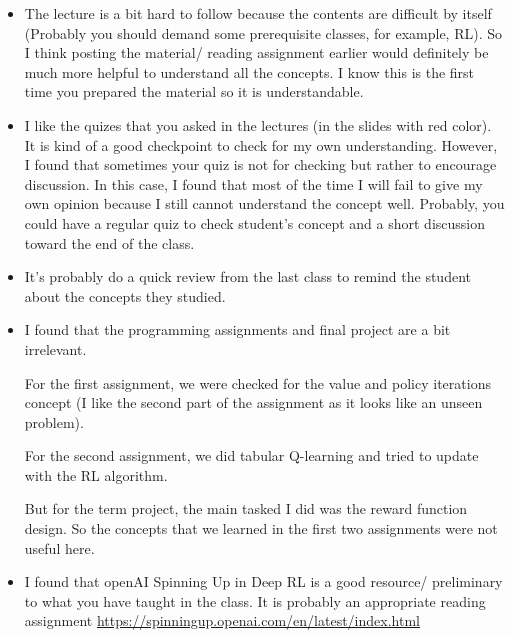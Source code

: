 \documentclass{article}
\begin{document}
    \begin{itemize}
        \item The lecture is a bit hard to follow because the contents are difficult by itself (Probably you should demand some prerequisite classes, for example, RL). 
                So I think posting the material/ reading assignment earlier would definitely be much more helpful to understand all the concepts. 
                I know this is the first time you prepared the material so it is understandable.
        \item I like the quizes that you asked in the lectures (in the slides with red color). It is kind of a good checkpoint to check for my own understanding. 
                However, I found that sometimes your quiz is not for checking but rather to encourage discussion.
                In this case, I found that most of the time I will fail to give my own opinion because I still cannot understand the concept well. Probably, you could have a regular quiz to check student's concept 
                and a short discussion toward the end of the class.
        \item It's probably do a quick review from the last class to remind the student about the concepts they studied.
        \item I found that the programming assignments and final project are a bit irrelevant. 
        
              For the first assignment, we were checked for the value and policy iterations concept (I like the second part of the assignment as it looks like an unseen problem).
              
              For the second assignment, we did tabular Q-learning and tried to update with the RL algorithm. 
              
              But for the term project, the main tasked I did was the reward function design. So the concepts that we learned in the first two assignments were not useful here.

        \item I found that openAI Spinning Up in Deep RL is a good resource/ preliminary to what you have taught in the class. It is probably an appropriate reading assignment
                \url{https://spinningup.openai.com/en/latest/index.html}

    \end{itemize}
\end{document}
